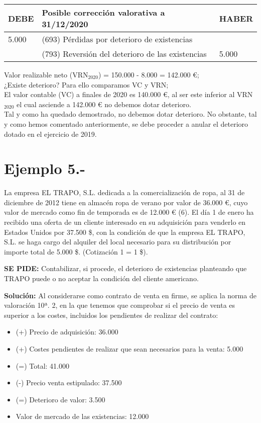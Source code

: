 \documentclass{article}
\begin{document}
\begin{table}[H]
    \centering
    \begin{tabular}{|l|l|l|}
    \hline
    \textbf{DEBE} & \textbf{Posible corrección valorativa a 31/12/2020} & \textbf{HABER} \\
    \hline
    5.000 & (693) Pérdidas por deterioro de existencias & \\
     & (793) Reversión del deterioro de las existencias & 5.000 \\
    \hline
    \end{tabular}
\end{table}
    
Valor realizable neto (VRN\(_{2020}\)) = 150.000 - 8.000 = 142.000 €; \\
¿Existe deterioro? Para ello comparamos VC y VRN; \\
El valor contable (VC) a finales de 2020 es 140.000 €, al ser este inferior al VRN\(_{2020}\) el cual asciende a 142.000 € no debemos dotar deterioro.\\

Tal y como ha quedado demostrado, no debemos dotar deterioro. No obstante, tal y como hemos comentado anteriormente, se debe proceder a anular el deterioro dotado en el ejercicio de 2019.

\section*{Ejemplo 5.-} La empresa EL TRAPO, S.L. dedicada a la comercialización de ropa, al 31 de diciembre de 2012 tiene en almacén ropa de verano por valor de 36.000 €, cuyo valor de mercado como fin de temporada es de 12.000 € (6). El día 1 de enero ha recibido una oferta de un cliente interesado en su adquisición para venderlo en Estados Unidos por 37.500 \$, con la condición de que la empresa EL TRAPO, S.L. se haga cargo del alquiler del local necesario para su distribución por importe total de 5.000 \$. (Cotización 1  = 1 \$).

\textbf{SE PIDE:} Contabilizar, si procede, el deterioro de existencias planteando que TRAPO puede o no aceptar la condición del cliente americano.

\textbf{Solución:} Al considerarse como contrato de venta en firme, se aplica la norma de valoración 10ª. 2, en la que tenemos que comprobar si el precio de venta es superior a los costes, incluidos los pendientes de realizar del contrato:

\begin{itemize}
    \item (+) Precio de adquisición: 36.000
    \item (+) Costes pendientes de realizar que sean necesarios para la venta: 5.000
    \item (=) Total: 41.000
    \item (-) Precio venta estipulado: 37.500
    \item (=) Deterioro de valor: 3.500
    \item Valor de mercado de las existencias: 12.000

\end{itemize}
\end{document}
